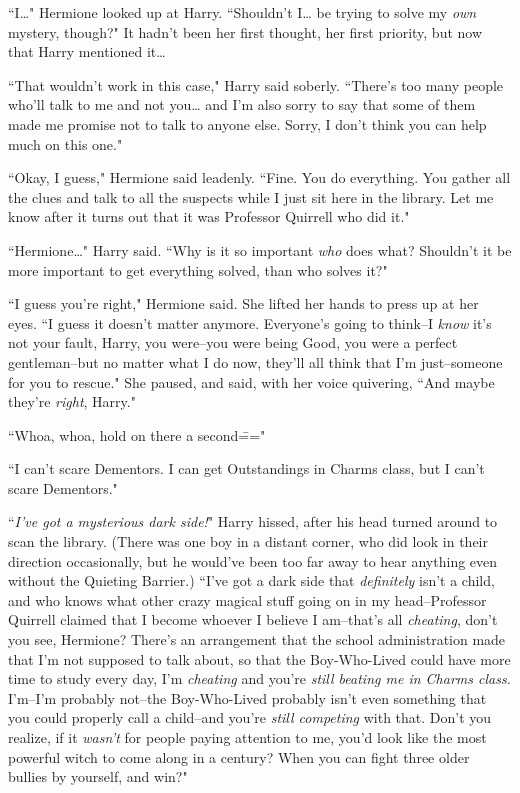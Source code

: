 ``I{\ldots}" Hermione looked up at Harry. ``Shouldn't I{\ldots} be trying to solve my \emph{own} mystery, though?" It hadn't been her first thought, her first priority, but now that Harry mentioned it{\ldots}

``That wouldn't work in this case," Harry said soberly. ``There's too many people who'll talk to me and not you{\ldots} and I'm also sorry to say that some of them made me promise not to talk to anyone else. Sorry, I don't think you can help much on this one."

``Okay, I guess," Hermione said leadenly. ``Fine. You do everything. You gather all the clues and talk to all the suspects while I just sit here in the library. Let me know after it turns out that it was Professor Quirrell who did it."

``Hermione{\ldots}" Harry said. ``Why is it so important \emph{who} does what? Shouldn't it be more important to get everything solved, than who solves it?"

``I guess you're right," Hermione said. She lifted her hands to press up at her eyes. ``I guess it doesn't matter anymore. Everyone's going to think\---I \emph{know} it's not your fault, Harry, you were\---you were being Good, you were a perfect gentleman\---but no matter what I do now, they'll all think that I'm just\---someone for you to rescue." She paused, and said, with her voice quivering, ``And maybe they're \emph{right}, Harry."

``Whoa, whoa, hold on there a second\==="

``I can't scare Dementors. I can get Outstandings in Charms class, but I can't scare Dementors."

``\emph{I've got a mysterious dark side!}" Harry hissed, after his head turned around to scan the library. (There was one boy in a distant corner, who did look in their direction occasionally, but he would've been too far away to hear anything even without the Quieting Barrier.) ``I've got a dark side that \emph{definitely} isn't a child, and who knows what other crazy magical stuff going on in my head\---Professor Quirrell claimed that I become whoever I believe I am\---that's all \emph{cheating}, don't you see, Hermione? There's an arrangement that the school administration made that I'm not supposed to talk about, so that the Boy-Who-Lived could have more time to study every day, I'm \emph{cheating} and you're \emph{still beating me in Charms class.} I'm\---I'm probably not\---the Boy-Who-Lived probably isn't even something that you could properly call a child\---and you're \emph{still competing} with that. Don't you realize, if it \emph{wasn't} for people paying attention to me, you'd look like the most powerful witch to come along in a century? When you can fight three older bullies by yourself, and win?"

